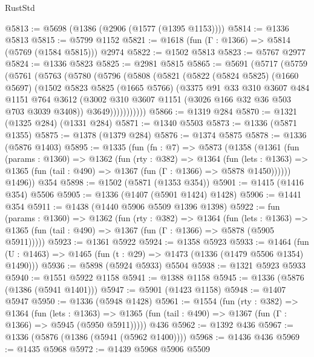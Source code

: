 \begin{lexlean}{RustStd}
\begin{coremodule}
{\begin{coremodule}
{{{{{{{{{{{{{{@5813 := @5698 (@1386 (@2906 (@1577 (@1395 @1153))))
@5814 := @1336 @5813
@5815 := @5799 @1152
@5821 := @1618 (fun (Γ : @1366) => @5814 (@5769 (@1584 @5815))) @2974
@5822 := @1502 @5813
@5823 := @5767 @2977
@5824 := @1336 @5823
@5825 := @2981 @5815
@5865 := @5691
    (@5717
      (@5759
        (@5761
          (@5763
            (@5780
              (@5796
                (@5808
                  (@5821
                    (@5822
                      (@5824 @5825)
                      (@1660 @5697)
                      (@1502
                        @5823
                        @5825
                        (@1665 @5766)
                        (@3375
                          @91
                          @33
                          @310
                          @3607
                          @484
                          @1151
                          @764
                          @3612
                          (@3002 @310 @3607 @1151 (@3026 @166 @32 @36 @503 @703 @3039 @3408))
                          @3649)))))))))))
@5866 := @1319 @284
@5870 := @1321 (@1325 @284) (@1331 @284)
@5871 := @1340 @5503
@5873 := @1336 (@5871 @1355)
@5875 := @1378 (@1379 @284)
@5876 := @1374 @5875
@5878 := @1336 (@5876 @1403)
@5895 := @1335
    (fun (fn : @7) =>
    @5873
      (@1358
        (@1361
          (fun (params : @1360) =>
          @1362
            (fun (rty : @382) =>
            @1364
              (fun (lets : @1363) =>
              @1365 (fun (tail : @490) => @1367 (fun (Γ : @1366) => @5878 @1450))))))
        @1496))
    @354
@5898 := @1502 (@5871 (@1353 @354))
@5901 := @1415 (@1416 @354) @5506
@5905 := @1336 (@1407 (@5901 @1424) @1428)
@5906 := @1441 @354
@5911 := @1438 (@1440 @5906 @5509 @1396 @1398)
@5922 := fun (params : @1360) =>
  @1362
    (fun (rty : @382) =>
    @1364
      (fun (lets : @1363) =>
      @1365 (fun (tail : @490) => @1367 (fun (Γ : @1366) => @5878 (@5905 @5911)))))
@5923 := @1361 @5922
@5924 := @1358 @5923
@5933 := @1464 (fun (U : @1463) => @1465 (fun (t : @29) => @1473 (@1336 (@1479 @5506 @1354) @1490)))
@5936 := @5898 (@5924 @5933) @5504
@5938 := @1321 @5923 @5933
@5940 := @1551 @5922 @1158
@5941 := @1388 @1158
@5945 := @1336 (@5876 (@1386 (@5941 @1401)))
@5947 := @5901 (@1423 @1158)
@5948 := @1407 @5947
@5950 := @1336 (@5948 @1428)
@5961 := @1554
    (fun (rty : @382) =>
    @1364
      (fun (lets : @1363) =>
      @1365 (fun (tail : @490) => @1367 (fun (Γ : @1366) => @5945 (@5950 @5911)))))
    @436
@5962 := @1392 @436
@5967 := @1336 (@5876 (@1386 (@5941 (@5962 @1400))))
@5968 := @1436 @436
@5969 := @1435 @5968
@5972 := @1439 @5968 @5906 @5509
}}}}}}}}}}}}}}
\end{coremodule}}
\end{coremodule}
\end{lexlean}
